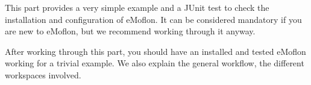 This part provides a very simple example and a JUnit test to check the installation and configuration of eMoflon. It can be considered mandatory if you are new to eMoflon, but we recommend working through it anyway.

After working through this part, you should have an installed and tested eMoflon working for a trivial example. We also explain the general workflow, the different workspaces involved.






